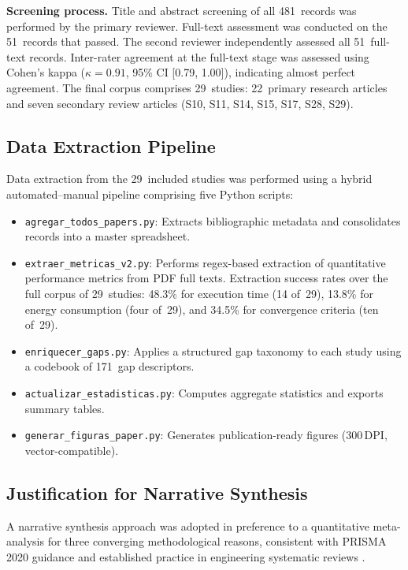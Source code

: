 \documentclass[review,3p]{elsarticle}
\begin{document}
\textbf{Screening process.} Title and abstract screening of all 481~records
was performed by the primary reviewer. Full-text assessment was conducted on
the 51~records that passed. The second reviewer independently assessed all
51~full-text records. Inter-rater agreement at the full-text stage was assessed
using Cohen's kappa ($\kappa=0.91$, 95\% CI [0.79, 1.00]), indicating almost
perfect agreement. The final corpus comprises 29~studies: 22~primary research
articles and seven secondary review articles (S10, S11, S14, S15, S17, S28, S29).

\subsection{Data Extraction Pipeline}

Data extraction from the 29~included studies was performed using a hybrid
automated--manual pipeline comprising five Python scripts:

\begin{itemize}
  \item \texttt{agregar\_todos\_papers.py}: Extracts bibliographic metadata
  and consolidates records into a master spreadsheet.
  \item \texttt{extraer\_metricas\_v2.py}: Performs regex-based extraction
  of quantitative performance metrics from PDF full texts. Extraction success
  rates over the full corpus of 29~studies: 48.3\% for execution time
  (14 of~29), 13.8\% for energy consumption (four of~29), and 34.5\% for
  convergence criteria (ten of~29).
  \item \texttt{enriquecer\_gaps.py}: Applies a structured gap taxonomy to
  each study using a codebook of 171~gap descriptors.
  \item \texttt{actualizar\_estadisticas.py}: Computes aggregate statistics
  and exports summary tables.
  \item \texttt{generar\_figuras\_paper.py}: Generates publication-ready
  figures (300\,DPI, vector-compatible).
\end{itemize}

\subsection{Justification for Narrative Synthesis}
\label{subsec:narrative_synthesis}

A narrative synthesis approach was adopted in preference to a quantitative
meta-analysis for three converging methodological reasons, consistent with
PRISMA 2020 guidance \cite{page2021} and established practice in engineering
systematic reviews \cite{brambilla2013}.
\end{document}
